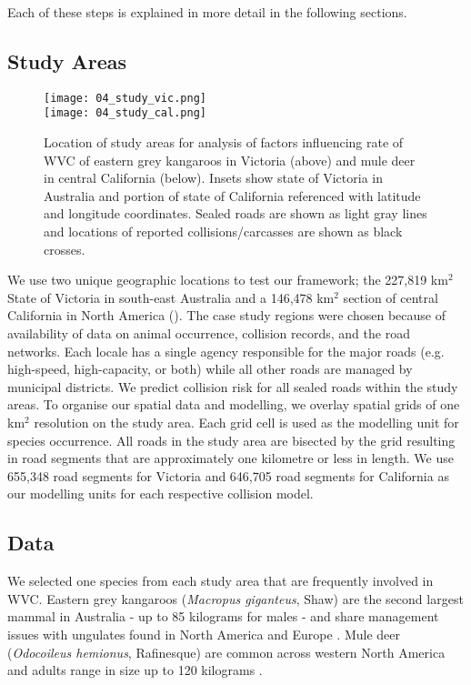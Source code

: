 Each of these steps is explained in more detail in the following sections.

\subsection{Study Areas}

\begin{figure*}[htp]
  \centering
  \texttt{[image: 04\_study\_vic.png]}\\
  \texttt{[image: 04\_study\_cal.png]}
  \caption[Locations of WVC for eastern grey kangaroos in Victoria and mule deer in central California]{Location of study areas for analysis of factors influencing rate of WVC of eastern grey kangaroos in Victoria (above) and mule deer in central California (below). Insets show state of Victoria in Australia and portion of state of California referenced with latitude and longitude coordinates.  Sealed roads are shown as light gray lines and locations of reported collisions/carcasses are shown as black crosses.}
  \label{cal_study_area}
\end{figure*}

We use two unique geographic locations to test our framework; the 227,819 km$^2$ State of Victoria in south-east Australia and a 146,478 km$^2$ section of central California in North America (). The case study regions were chosen because of availability of data on animal occurrence, collision records, and the road networks. Each locale has a single agency responsible for the major roads (e.g. high-speed, high-capacity, or both) while all other roads are managed by municipal districts. We predict collision risk for all sealed roads within the study areas. To organise our spatial data and modelling, we overlay spatial grids of one km$^2$ resolution on the study area. Each grid cell is used as the modelling unit for species occurrence. All roads in the study area are bisected by the grid resulting in road segments that are approximately one kilometre or less in length. We use 655,348 road segments for Victoria and 646,705 road segments for California as our modelling units for each respective collision model.

\subsection{Data}

We selected one species from each study area that are frequently involved in WVC. Eastern grey kangaroos (\textit{Macropus giganteus}, Shaw) are the second largest mammal in Australia - up to 85 kilograms for males \citep{vand08} - and share management issues with ungulates found in North America and Europe \citep{crof04,coul10}.  Mule deer (\textit{Odocoileus hemionus}, Rafinesque) are common across western North America and adults range in size up to 120 kilograms \citep{kays09}.

